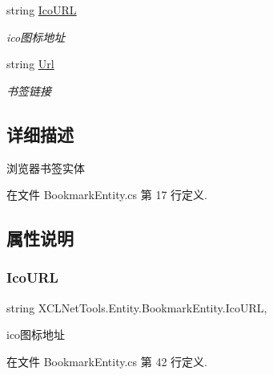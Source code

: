 \begin{DoxyCompactItemize}
string \hyperlink{class_x_c_l_net_tools_1_1_entity_1_1_bookmark_entity_af370dbfd32e8cde501e305c6999c077b}{Ico\+U\+RL}
\begin{DoxyCompactList}\small\item\em ico图标地址 \end{DoxyCompactList}\item 
string \hyperlink{class_x_c_l_net_tools_1_1_entity_1_1_bookmark_entity_a88ebfe2441fd5804a82f5eaee1ce3232}{Url}
\begin{DoxyCompactList}\small\item\em 书签链接 \end{DoxyCompactList}\end{DoxyCompactItemize}


\subsection{详细描述}
浏览器书签实体 



在文件 Bookmark\+Entity.\+cs 第 17 行定义.



\subsection{属性说明}
\mbox{\label{class_x_c_l_net_tools_1_1_entity_1_1_bookmark_entity_af370dbfd32e8cde501e305c6999c077b}} 
\subsubsection{\texorpdfstring{Ico\+U\+RL}{IcoURL}}
{\footnotesize\ttfamily string X\+C\+L\+Net\+Tools.\+Entity.\+Bookmark\+Entity.\+Ico\+U\+RL\hspace{0.3cm}{\ttfamily [get]}, {\ttfamily [set]}}



ico图标地址 



在文件 Bookmark\+Entity.\+cs 第 42 行定义.


